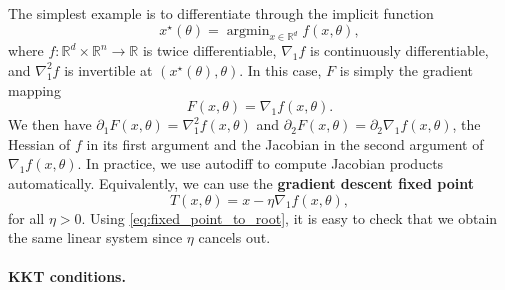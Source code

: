 \documentclass{article}
\def\RR{{\mathbb R}}
\DeclareMathOperator*{\argmin}{argmin}
\begin{document}
The simplest example is to differentiate through the implicit function
\begin{equation}
x^\star(\theta) = \argmin_{x \in \RR^d} f(x, \theta),
\end{equation}
where $f \colon \RR^d \times \RR^n \to \RR$ is twice differentiable, $\nabla_1
f$ is continuously differentiable, and $\nabla^2_1 f$ is invertible at
$(x^\star(\theta),\theta)$.
In this case, $F$ is simply the gradient mapping
\begin{equation}
F(x, \theta) = \nabla_1 f(x, \theta).
\label{eq:stationary_cond}
\end{equation}
We then have
$\partial_1 F(x, \theta) = \nabla^2_1 f(x, \theta)$
and
$\partial_2 F(x, \theta) = \partial_2 \nabla_1 f(x, \theta)$,
the Hessian of $f$ in its first argument and the
Jacobian in the second argument of $\nabla_1 f(x, \theta)$. In practice,
we use autodiff to compute Jacobian products automatically.
Equivalently, we can use the \textbf{gradient descent fixed point}
\begin{equation}
T(x, \theta) = x - \eta \nabla_1 f(x, \theta),
\label{eq:gradient_descent_fp}
\end{equation}
for all $\eta > 0$. Using \eqref{eq:fixed_point_to_root}, 
it is easy to check that we obtain
the same linear system since $\eta$ cancels out.

\paragraph{KKT conditions.}
\end{document}
